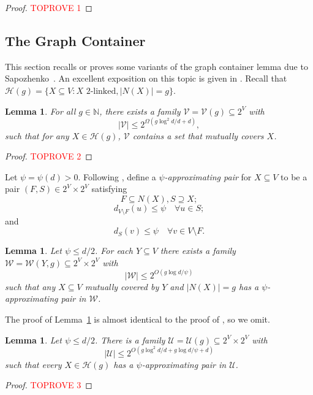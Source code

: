 \documentclass{amsart}
\newtheorem{lem}[thm]{Lemma}
\theoremstyle{definition}
\newcommand{\gO}{\Omega}
\newcommand{\cH}{\mathcal{H} }
\newcommand{\cU}{\mathcal{U} }
\newcommand{\beq}[1]{\begin{equation}\label{#1}}
\newcommand{\enq}[0]{\end{equation}}
\newcommand{\nin}[0]{\noindent}
\newcommand{\sub}[0]{\subseteq}
\newcommand{\0}[0]{\emptyset}
\begin{document}
\begin{proof}\textcolor{red}{TOPROVE 1}\end{proof}



\subsection{The Graph Container}\label{subsec.graph container}

This section recalls or proves some variants of the graph container lemma due to Sapozhenko~\cite{Sap87}. An excellent exposition on this topic is given in \cite{GS}. Recall that $\cH(g)=\{X \sub V: X \mbox{ 2-linked}, |N(X)|=g\}$. 

\begin{lem}\label{lem:contain1}
For all $g\in\mathbb{N}$, there exists a family $\mathcal{V}=\mathcal{V}(g)\subseteq 2^V$ with 
\[
|\mathcal{V}|\leq 2^{\gO(g \log^2 d/d + d)},
\]
such that for any $X\in\cH(g)$, $\mathcal{V}$ contains a set that mutually covers $X$.
\end{lem}
\begin{proof}\textcolor{red}{TOPROVE 2}\end{proof}

Let $\psi=\psi(d)>0$. Following \cite{GS, JK}, define a \textit{$\psi$-approximating pair} for $X \sub V$ to be a pair $(F,S) \in 2^V \times 2^V$ satisfying
\beq{approx1} F \sub N(X), S \supseteq X;\enq
\beq{approx2} d_{V \setminus F} (u) \le \psi \quad \forall u \in S;\enq
and
\beq{approx3} d_S(v) \le \psi \quad \forall v \in V \setminus F.\enq


\begin{lem}\label{lem:contain2}
Let $\psi\leq d/2$. For each $Y\subseteq V$ there exists a family $\mathcal{W}=\mathcal{W}(Y, g)\subseteq 2^V\times 2^V$ with 
\[
|\mathcal{W}|\leq 2^{O(g \log d/\psi)}
\]
such that any $X\subseteq V$ mutually covered by $Y$ and $|N(X)|=g$ has a $\psi$-approximating pair in $\mathcal{W}$.
\end{lem}
\nin The proof of Lemma~\ref{lem:contain2} is almost identical to the proof of \cite[Lemma 7.5]{JK}, so we omit.
\begin{lem}\label{lem:container}
Let $\psi \le d/2$. There is a family $\cU=\cU(g) \sub 2^V \times 2^V$ with
\[|\cU|\le 2^{O(g\log^2 d/d + g\log d/\psi+d)}\]
such that every $X \in \cH(g)$ has a $\psi$-approximating pair in $\cU$.
\end{lem}

\begin{proof}\textcolor{red}{TOPROVE 3}\end{proof}
\end{document}
